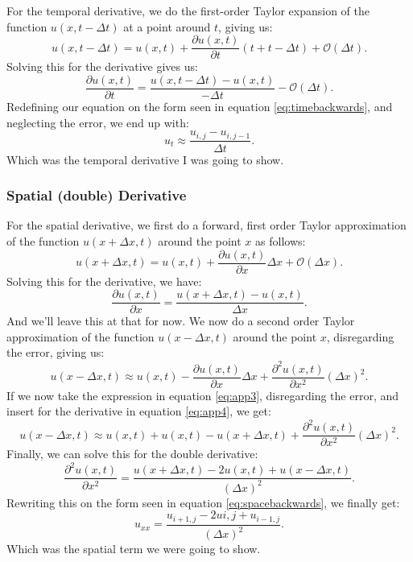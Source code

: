 \documentclass[reprint,english,notitlepage]{revtex4-1}  %
\begin{document}
\begin{appendix}
For the temporal derivative, we do the first-order Taylor expansion of the function $u(x,t-\Delta t)$ at a point around $t$, giving us:
\begin{equation}
    u(x,t-\Delta t) = u(x,t) + \frac{\partial u(x,t)}{\partial t}(t+t-\Delta t) + \mathcal{O}(\Delta t).
\end{equation}
Solving this for the derivative gives us:
\begin{equation}
    \frac{\partial u(x,t)}{\partial t} = \frac{u(x,t-\Delta t) - u(x,t)}{-\Delta t} - \mathcal{O}(\Delta t).
\end{equation}
Redefining our equation on the form seen in equation \ref{eq:timebackwards}, and neglecting the error, we end up with:
\begin{equation}
    u_{t} \approx \frac{u_{i,j} - u_{i,j-1}}{\Delta t}.
\end{equation}
Which was the temporal derivative I was going to show.

\subsubsection{Spatial (double) Derivative}

For the spatial derivative, we first do a forward, first order Taylor approximation of the function $u(x+\Delta x,t)$ around the point $x$ as follows:
\begin{equation}
    u(x+\Delta x,t) = u(x,t) + \frac{\partial u(x,t)}{\partial x}\Delta x + \mathcal{O}(\Delta x). 
\end{equation}
Solving this for the derivative, we have:
\begin{equation}\label{eq:app3}
    \frac{\partial u(x,t)}{\partial x} = \frac{u(x+\Delta x,t) - u(x,t)}{\Delta x}.
\end{equation}
And we'll leave this at that for now. We now do a second order Taylor approximation of the function $u(x-\Delta x,t)$ around the point $x$, disregarding the error, giving us:
\begin{equation}\label{eq:app4}
    u(x-\Delta x,t) \approx u(x,t) - \frac{\partial u(x,t)}{\partial x}\Delta x + \frac{\partial^2 u(x,t)}{\partial x^2}(\Delta x)^2.
\end{equation}
If we now take the expression in equation \ref{eq:app3}, disregarding the error, and insert for the derivative in equation \ref{eq:app4}, we get:
\begin{equation}
    u(x-\Delta x,t) \approx u(x,t) + u(x,t) - u(x+\Delta x,t) + \frac{\partial^2 u(x,t)}{\partial x^2}(\Delta x)^2.
\end{equation}
Finally, we can solve this for the double derivative:
\begin{equation}
    \frac{\partial^2 u(x,t)}{\partial x^2} = \frac{u(x+\Delta x,t) - 2u(x,t) + u(x-\Delta x,t)}{(\Delta x)^2}.
\end{equation}
Rewriting this on the form seen in equation \ref{eq:spacebackwards}, we finally get:
\begin{equation}
    u_{xx} = \frac{u_{i+1,j} - 2u{i,j} + u_{i-1,j}}{(\Delta x)^2}.
\end{equation}
Which was the spatial term we were going to show.


\end{appendix}
\end{document}
